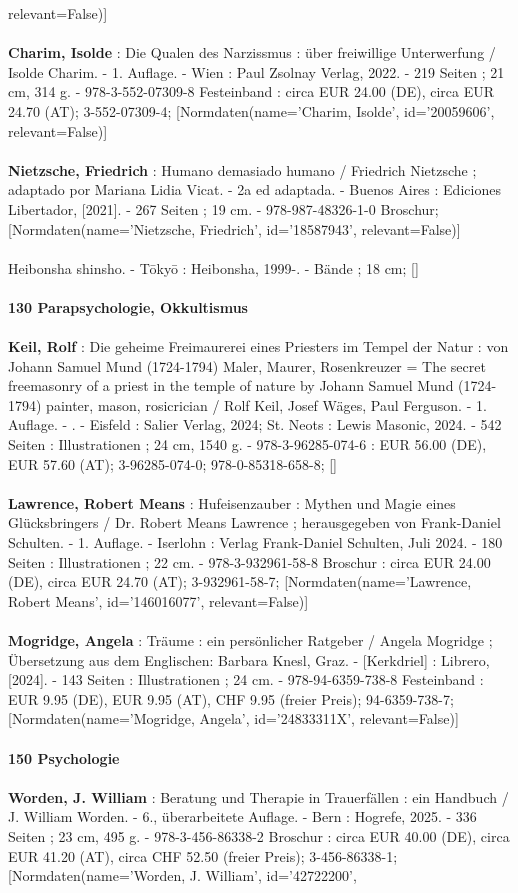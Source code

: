\documentclass{article}
\begin{document}
\begin{multicols}{3}
relevant=False)]\\\\\textbf{Charim, Isolde} : Die Qualen des Narzissmus : über freiwillige Unterwerfung / Isolde Charim. - 1. Auflage. - Wien : Paul Zsolnay Verlag, 2022. - 219 Seiten ; 21 cm, 314 g. - 978-3-552-07309-8 Festeinband : circa EUR 24.00 (DE), circa EUR 24.70 (AT); 3-552-07309-4; [Normdaten(name='Charim, Isolde', id='20059606', relevant=False)]\\\\\textbf{Nietzsche, Friedrich} : Humano demasiado humano / Friedrich Nietzsche ; adaptado por Mariana Lidia Vicat. - 2a ed adaptada. - Buenos Aires : Ediciones Libertador, [2021]. - 267 Seiten ; 19 cm. - 978-987-48326-1-0 Broschur; [Normdaten(name='Nietzsche, Friedrich', id='18587943', relevant=False)]\\\\Heibonsha shinsho. - Tōkyō : Heibonsha, 1999-. - Bände ; 18 cm; []\\\\\textbf{130 Parapsychologie, Okkultismus}\\\\\textbf{Keil, Rolf} : Die geheime Freimaurerei eines Priesters im Tempel der Natur : von Johann Samuel Mund (1724-1794) Maler, Maurer, Rosenkreuzer = The secret freemasonry of a priest in the temple of nature by Johann Samuel Mund (1724-1794) painter, mason, rosicrician / Rolf Keil, Josef Wäges, Paul Ferguson. - 1. Auflage. - . - Eisfeld : Salier Verlag, 2024; St. Neots : Lewis Masonic, 2024. - 542 Seiten : Illustrationen ; 24 cm, 1540 g. - 978-3-96285-074-6 : EUR 56.00 (DE), EUR 57.60 (AT); 3-96285-074-0; 978-0-85318-658-8; []\\\\\textbf{Lawrence, Robert Means} : Hufeisenzauber : Mythen und Magie eines Glücksbringers / Dr. Robert Means Lawrence ; herausgegeben von Frank-Daniel Schulten. - 1. Auflage. - Iserlohn : Verlag Frank-Daniel Schulten, Juli 2024. - 180 Seiten : Illustrationen ; 22 cm. - 978-3-932961-58-8 Broschur : circa EUR 24.00 (DE), circa EUR 24.70 (AT); 3-932961-58-7; [Normdaten(name='Lawrence, Robert Means', id='146016077', relevant=False)]\\\\\textbf{Mogridge, Angela} : Träume : ein persönlicher Ratgeber / Angela Mogridge ; Übersetzung aus dem Englischen: Barbara Knesl, Graz. - [Kerkdriel] : Librero, [2024]. - 143 Seiten : Illustrationen ; 24 cm. - 978-94-6359-738-8 Festeinband : EUR 9.95 (DE), EUR 9.95 (AT), CHF 9.95 (freier Preis); 94-6359-738-7; [Normdaten(name='Mogridge, Angela', id='24833311X', relevant=False)]\\\\\textbf{150 Psychologie}\\\\\textbf{Worden, J. William} : Beratung und Therapie in Trauerfällen : ein Handbuch / J. William Worden. - 6., überarbeitete Auflage. - Bern : Hogrefe, 2025. - 336 Seiten ; 23 cm, 495 g. - 978-3-456-86338-2 Broschur : circa EUR 40.00 (DE), circa EUR 41.20 (AT), circa CHF 52.50 (freier Preis); 3-456-86338-1; [Normdaten(name='Worden, J. William', id='42722200', 
\end{multicols}
\end{document}
